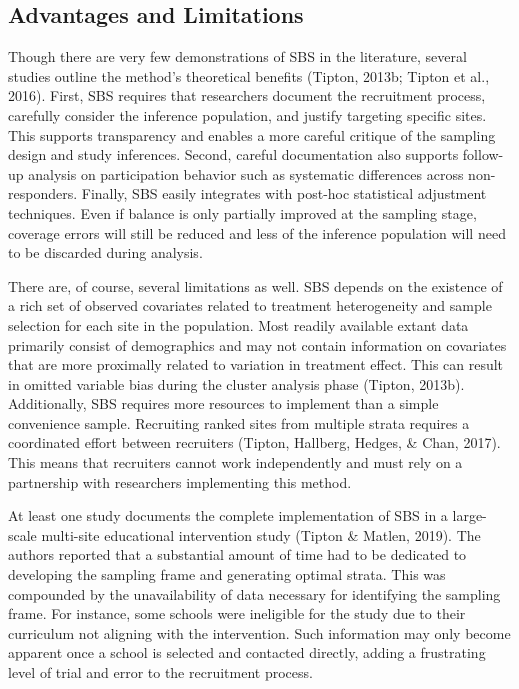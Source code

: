 \documentclass[english,man,floatsintext]{apa6}
\begin{document}
\hypertarget{advantages-and-limitations}{%
\subsection{Advantages and Limitations}\label{advantages-and-limitations}}

Though there are very few demonstrations of SBS in the literature, several studies outline the method's theoretical benefits (Tipton, 2013b; Tipton et al., 2016). First, SBS requires that researchers document the recruitment process, carefully consider the inference population, and justify targeting specific sites. This supports transparency and enables a more careful critique of the sampling design and study inferences. Second, careful documentation also supports follow-up analysis on participation behavior such as systematic differences across non-responders. Finally, SBS easily integrates with post-hoc statistical adjustment techniques. Even if balance is only partially improved at the sampling stage, coverage errors will still be reduced and less of the inference population will need to be discarded during analysis.

There are, of course, several limitations as well. SBS depends on the existence of a rich set of observed covariates related to treatment heterogeneity and sample selection for each site in the population. Most readily available extant data primarily consist of demographics and may not contain information on covariates that are more proximally related to variation in treatment effect. This can result in omitted variable bias during the cluster analysis phase (Tipton, 2013b). Additionally, SBS requires more resources to implement than a simple convenience sample. Recruiting ranked sites from multiple strata requires a coordinated effort between recruiters (Tipton, Hallberg, Hedges, \& Chan, 2017). This means that recruiters cannot work independently and must rely on a partnership with researchers implementing this method.

At least one study documents the complete implementation of SBS in a large-scale multi-site educational intervention study (Tipton \& Matlen, 2019). The authors reported that a substantial amount of time had to be dedicated to developing the sampling frame and generating optimal strata. This was compounded by the unavailability of data necessary for identifying the sampling frame. For instance, some schools were ineligible for the study due to their curriculum not aligning with the intervention. Such information may only become apparent once a school is selected and contacted directly, adding a frustrating level of trial and error to the recruitment process.
\end{document}

